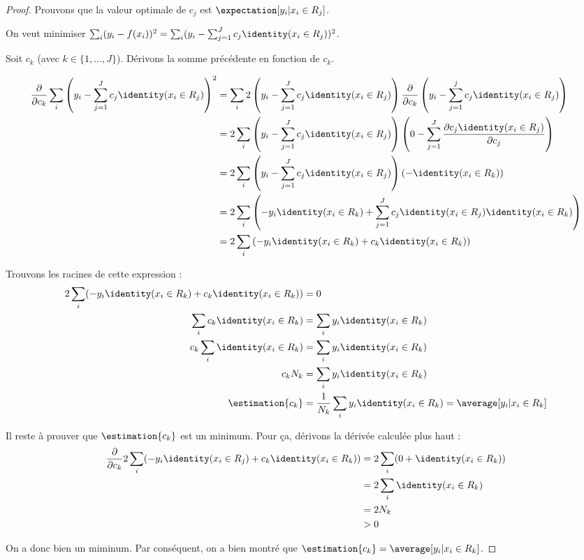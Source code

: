     \begin{proof}
        Prouvons que la valeur optimale de \(c_j\) est \(\expectation[y_i | x_i \in R_j]\).

        On veut minimiser \(\sum_i (y_i - f(x_i))^2 = \sum_i (y_i - \sum_{j=1}^J c_j \identity(x_i \in R_j))^2\).

        Soit \(c_k\) (avec \(k \in \{1, \dots, J\}\)). Dérivons la somme précédente en fonction de \(c_k\).

        \begin{align*}
            \frac{\partial}{\partial c_k} \sum_{i} \left(y_i - \sum_{j=1}^J c_j \identity(x_i \in R_j)\right)^2 &= \sum_i 2 \left(y_i - \sum_{j=1}^J c_j \identity(x_i \in R_j)\right) \frac{\partial}{\partial c_k} \left(y_i - \sum_{j=1}^j c_j \identity(x_i \in R_j)\right)\\
            &= 2 \sum_i \left(y_i - \sum_{j=1}^J c_j \identity(x_i \in R_j)\right) \left(0 - \sum_{j=1}^J \frac{\partial c_j \identity(x_i \in R_j)}{\partial c_j}\right)\\
            &= 2 \sum_i \left(y_i - \sum_{j=1}^J c_j \identity(x_i \in R_j)\right) \left(- \identity(x_i \in R_k)\right)\\
            &= 2 \sum_i \left(-y_i \identity(x_i \in R_k) + \sum_{j=1}^J c_j \identity(x_i \in R_j) \identity(x_i \in R_k)\right)\\
            &= 2 \sum_i \left(-y_i \identity(x_i \in R_k) + c_k \identity(x_i \in R_k)\right)
        \end{align*}

        Trouvons les racines de cette expression :
        \begin{align*}
            2 \sum_i (-y_i \identity(x_i \in R_k) + c_k \identity(x_i \in R_k)) &= 0\\
            \sum_i c_k \identity(x_i \in R_k) &= \sum_i y_i \identity(x_i \in R_k)\\
            c_k \sum_i \identity(x_i \in R_k) &= \sum_i y_i \identity(x_i \in R_k)\\
            c_k N_k &= \sum_i y_i \identity(x_i \in R_k)\\
            \estimation{c_k} &= \frac{1}{N_k} \sum_i y_i \identity(x_i \in R_k) = \average[y_i | x_i \in R_k]
        \end{align*}

        Il reste à prouver que \(\estimation{c_k}\) est un minimum. Pour ça, dérivons la dérivée calculée plus haut :
        \begin{align*}
            \frac{\partial}{\partial c_k} 2 \sum_{i} (-y_i \identity(x_i \in R_j) + c_k \identity(x_i \in R_k)) &= 2 \sum_i (0 + \identity(x_i \in R_k))\\
            &= 2 \sum_i \identity(x_i \in R_k)\\
            &= 2 N_k\\
            &> 0
        \end{align*}

        On a donc bien un miminum. Par conséquent, on a bien montré que \(\estimation{c_k} = \average[y_i | x_i \in R_k]\).
    \end{proof}

